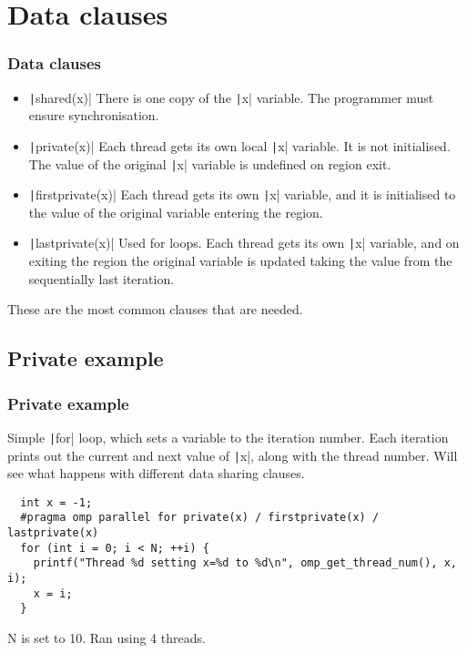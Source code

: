\documentclass{beamer}
\begin{document}
\section{Data clauses}
\begin{frame}
\frametitle{Data clauses}
\begin{itemize}
  \item \texttt|shared(x)|
    There is one copy of the \texttt|x| variable. The programmer must ensure synchronisation.
  \item \texttt|private(x)|
    Each thread gets its own local \texttt|x| variable. It is not initialised. The value of the original \texttt|x| variable is undefined on region exit.
  \item \texttt|firstprivate(x)|
    Each thread gets its own \texttt|x| variable, and it is initialised to the value of the original variable entering the region.
  \item \texttt|lastprivate(x)|
    Used for loops. Each thread gets its own \texttt|x| variable, and on exiting the region the original variable is updated taking the value from the sequentially last iteration.
\end{itemize}

These are the most common clauses that are needed.
\end{frame}

\subsection{Private example}
\begin{frame}[fragile]
\frametitle{Private example}
Simple \texttt|for| loop, which sets a variable to the iteration number.
Each iteration prints out the current and next value of \texttt|x|, along with the thread number.
Will see what happens with different data sharing clauses.

\begin{verbatim}
  int x = -1;
  #pragma omp parallel for private(x) / firstprivate(x) / lastprivate(x)
  for (int i = 0; i < N; ++i) {
    printf("Thread %d setting x=%d to %d\n", omp_get_thread_num(), x, i);
    x = i;
  }
\end{verbatim}
N is set to 10.
Ran using 4 threads.
\end{frame}
\end{document}
